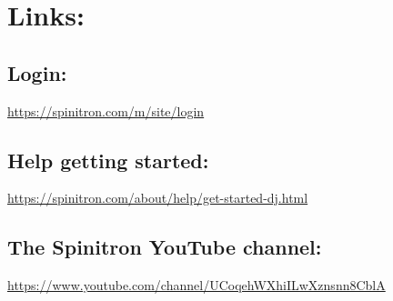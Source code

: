 \documentclass[12pt]{article}
\begin{document}
\newpage

\section{Links:}

\subsection{Login:}

\url{https://spinitron.com/m/site/login}

\subsection{Help getting started:}

\url{https://spinitron.com/about/help/get-started-dj.html}

\subsection{The Spinitron YouTube channel:}

\url{https://www.youtube.com/channel/UCoqehWXhiILwXznsnn8CblA} \cite{padhi2009model,maity2014generalized,mondal2018angle}

\newpage







\newpage

\listoffigures
\medskip
\end{document}
